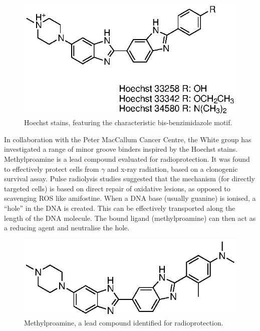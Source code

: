 \begin{refsection}
\begin{figure}
\centering
\includegraphics[scale=0.74]{Figures/hoechst.eps}
\caption{Hoechst stains, featuring the characteristic bis-benzimidazole motif.}\label{fig:hoechst}
\end{figure}


In collaboration with the Peter MacCallum Cancer Centre, the White group has investigated a range of minor groove binders inspired by the Hoechst stains.
Methylproamine is a lead compound evaluated for radioprotection.
It was found to effectively protect cells from $\gamma$ and x-ray radiation, based on a clonogenic survival assay.
Pulse radiolysis studies suggested that the mechanism (for directly targeted cells) is based on direct repair of oxidative lesions, as opposed to scavenging ROS like amifostine.
When a DNA base (usually guanine) is ionised, a ``hole'' in the DNA is created.
This can be effectively transported along the length of the DNA molecule\autocite{Giese2002}.
The bound ligand (methylproamine) can then act as a reducing agent and neutralise the hole.

\begin{figure}
\includegraphics[scale=0.74]{Figures/methylproamine.eps}
\caption{Methylproamine, a lead compound identified for radioprotection.}\label{fig:methylproamine}
\end{figure}


\end{refsection}
